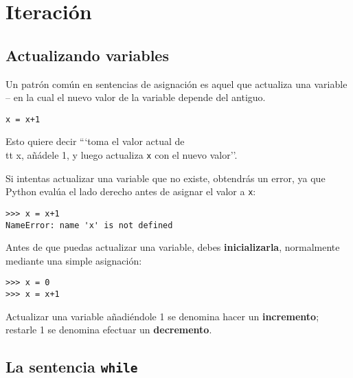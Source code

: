 
\chapter{Iteración}

\section{Actualizando variables}
\label{update}


Un patrón común en sentencias de asignación es aquel
que actualiza una variable --
en la cual el nuevo valor de la variable depende del antiguo.

\beforeverb
\begin{verbatim}
x = x+1
\end{verbatim}
\afterverb
%
Esto quiere decir ```toma el valor actual de {\\tt x}, añádele 1, y luego
actualiza {\tt x} con el nuevo valor''.

Si intentas actualizar una variable que no existe, obtendrás
un error, ya que Python evalúa el lado derecho antes de asignar
el valor a {\tt x}:

\beforeverb
\begin{verbatim}
>>> x = x+1
NameError: name 'x' is not defined
\end{verbatim}
\afterverb
%
Antes de que puedas actualizar una variable, debes {\bf inicializarla},
normalmente mediante una simple asignación:


\beforeverb
\begin{verbatim}
>>> x = 0
>>> x = x+1
\end{verbatim}
\afterverb
%
Actualizar una variable añadiéndole 1 se denomina hacer un {\bf incremento};
restarle 1 se denomina efectuar un {\bf decremento}.


\section{La sentencia {\tt while}}


